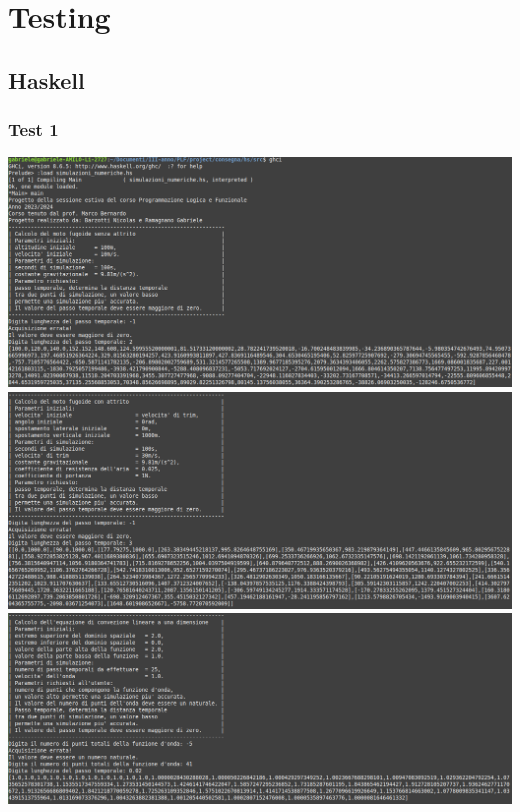 \section{Testing}

\subsection{Haskell}

\subsubsection*{Test 1}
\includegraphics[width=\textwidth,height=\textheight,keepaspectratio]{05_testing/image/hs/01_test/01_negativo.png}
\\
\includegraphics[width=\textwidth,height=\textheight,keepaspectratio]{05_testing/image/hs/01_test/02_negativo.png}
\\
\includegraphics[width=\textwidth,height=\textheight,keepaspectratio]{05_testing/image/hs/01_test/03_negativo.png}
